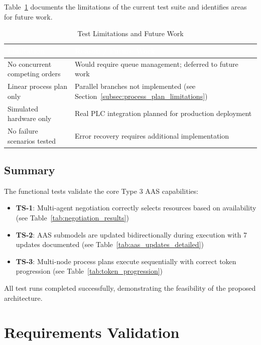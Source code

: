 Table~\ref{tab:test_limitations} documents the limitations of the current test suite and identifies areas for future work.

\begin{table}[ht]
\centering
\caption{Test Limitations and Future Work}
\label{tab:test_limitations}
\begin{tabular}{p{}p{}}
\toprule
\rowcolor{headerblue}
\textcolor{white}{Limitation} & \textcolor{white}{Reason / Future Work} \\
\midrule
No concurrent competing orders & Would require queue management; deferred to future work \\
\rowcolor{lightgray}
Linear process plan only & Parallel branches not implemented (see Section~\ref{subsec:process_plan_limitations}) \\
Simulated hardware only & Real PLC integration planned for production deployment \\
\rowcolor{lightgray}
No failure scenarios tested & Error recovery requires additional implementation \\
\bottomrule
\end{tabular}
\end{table}

\subsection{Summary}

The functional tests validate the core Type 3 \ac{AAS} capabilities:

\begin{itemize}
    \item \textbf{TS-1}: Multi-agent negotiation correctly selects resources based on availability (see Table~\ref{tab:negotiation_results})
    \item \textbf{TS-2}: \ac{AAS} submodels are updated bidirectionally during execution with 7 updates documented (see Table~\ref{tab:aas_updates_detailed})
    \item \textbf{TS-3}: Multi-node process plans execute sequentially with correct token progression (see Table~\ref{tab:token_progression})
\end{itemize}

All test runs completed successfully, demonstrating the feasibility of the proposed architecture.
\section{Requirements Validation}
\label{sec:requirements_validation}


